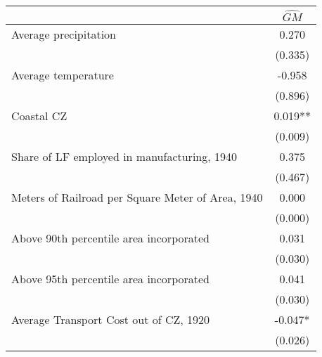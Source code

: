  \begin{tabular}{l*{1}{c}} \toprule
                &\multicolumn{1}{c}{$\widehat{GM}$}\\
\midrule
Average precipitation&    0.270   \\
                &  (0.335)   \\
\addlinespace
Average temperature&   -0.958   \\
                &  (0.896)   \\
\addlinespace
Coastal CZ      &    0.019** \\
                &  (0.009)   \\
\addlinespace
Share of LF employed in manufacturing, 1940&    0.375   \\
                &  (0.467)   \\
\addlinespace
Meters of Railroad per Square Meter of Area, 1940&    0.000   \\
                &  (0.000)   \\
\addlinespace
Above 90th percentile area incorporated&    0.031   \\
                &  (0.030)   \\
\addlinespace
Above 95th percentile area incorporated&    0.041   \\
                &  (0.030)   \\
\addlinespace
Average Transport Cost out of CZ, 1920&   -0.047*  \\
                &  (0.026)   \\
 \bottomrule \end{tabular}
